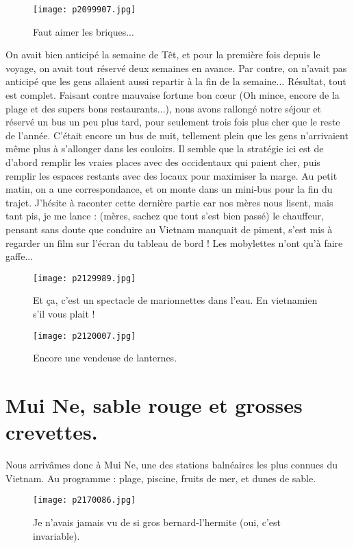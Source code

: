 \documentclass{book}
\begin{document}
\begin{figure}[h]
\centering
\texttt{[image: p2099907.jpg]}
\caption*{Faut aimer les briques...}
\end{figure}

On avait bien anticipé la semaine de Têt, et pour la première fois depuis le voyage, on avait tout réservé deux semaines en avance. Par contre, on n'avait pas anticipé que les gens allaient aussi repartir à la fin de la semaine... Résultat, tout est complet. Faisant contre mauvaise fortune bon cœur (Oh mince, encore de la plage et des supers bons restaurants...), nous avons rallongé notre séjour et réservé un bus un peu plus tard, pour seulement trois fois plus cher que le reste de l'année. C'était encore un bus de nuit, tellement plein que les gens n'arrivaient même plus à s'allonger dans les couloirs. Il semble que la stratégie ici est de d'abord remplir les vraies places avec des occidentaux qui paient cher, puis remplir les espaces restants avec des locaux pour maximiser la marge. Au petit matin, on a une correspondance, et on monte dans un mini-bus pour la fin du trajet. J'hésite à raconter cette dernière partie car nos mères nous lisent, mais tant pis, je me lance : (mères, sachez que tout s'est bien passé) le chauffeur, pensant sans doute que conduire au Vietnam manquait de piment, s'est mis à regarder un film sur l'écran du tableau de bord ! Les mobylettes n'ont qu'à faire gaffe...


\begin{figure}[h]
\centering
\texttt{[image: p2129989.jpg]}
\caption*{Et ça, c'est un spectacle de marionnettes dans l'eau. En vietnamien s'il vous plait !}
\end{figure}


\begin{figure}[h]
\centering
\texttt{[image: p2120007.jpg]}
\caption*{Encore une vendeuse de lanternes.}
\end{figure}



\chapter{Mui Ne, sable rouge et grosses crevettes.}
Nous arrivâmes donc à Mui Ne, une des stations balnéaires les plus connues du Vietnam. Au programme : plage, piscine, fruits de mer, et dunes de sable.


\begin{figure}[h]
\centering
\texttt{[image: p2170086.jpg]}
\caption*{Je n'avais jamais vu de si gros bernard-l'hermite (oui, c'est invariable).}
\end{figure}
\end{document}
